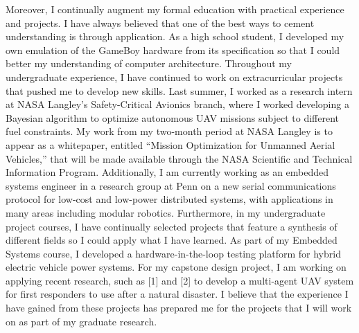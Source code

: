 \documentclass[]{article}
\begin{document}
Moreover, I continually augment my formal education with practical experience and projects. I have always believed that one of the best ways to cement understanding is through application. As a high school student, I developed my own emulation of the GameBoy hardware from its specification so that I could better my understanding of computer architecture. Throughout my undergraduate experience, I have continued to work on extracurricular projects that pushed me to develop new skills. Last summer, I worked as a research intern at NASA Langley’s Safety-Critical Avionics branch, where I worked developing a Bayesian algorithm to optimize autonomous UAV missions subject to different fuel constraints. My work from my two-month period at NASA Langley is to appear as a whitepaper, entitled “Mission Optimization for Unmanned Aerial Vehicles,” that will be made available through the NASA Scientific and Technical Information Program. Additionally, I am currently working as an embedded systems engineer in a research group at Penn on a new serial communications protocol for low-cost and low-power distributed systems, with applications in many areas including modular robotics. Furthermore, in my undergraduate project courses, I have continually selected projects that feature a synthesis of different fields so I could apply what I have learned. As part of my Embedded Systems course, I developed a hardware-in-the-loop testing platform for hybrid electric vehicle power systems. For my capstone design project, I am working on applying recent research, such as [1] and [2] to develop a multi-agent UAV system for first responders to use after a natural disaster. I believe that the experience I have gained from these projects has prepared me for the projects that I will work on as part of my graduate research.
\end{document}
